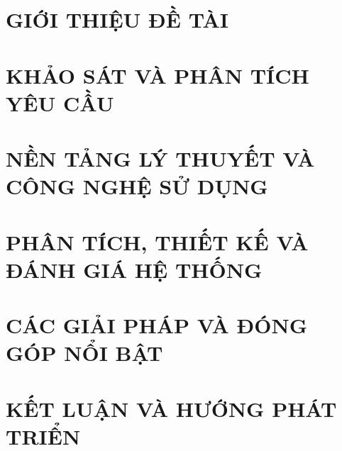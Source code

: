 \documentclass[a4paper,13pt,3p,oneside]{report}
\theoremstyle{definition}
\begin{document}
\renewcommand{\listtablename}{DANH MỤC BẢNG BIỂU}
{\let\oldnumberline\numberline
\renewcommand{\numberline}{Bảng~\oldnumberline}
\listoftables}

\newpage
\begingroup
\renewcommand{\thetable}{\arabic{table}}

\endgroup



\newpage
{}

\pagestyle{fancy}
\fancyhf{}
\fancyhead[L]{\leftmark}
\fancyfoot[R]{\thepage}

\chapter{GIỚI THIỆU ĐỀ TÀI}
\label{chapter:Introduction}

\newpage
\chapter{KHẢO SÁT VÀ PHÂN TÍCH YÊU CẦU}
\label{chapter:Related_works}



\newpage
\chapter{NỀN TẢNG LÝ THUYẾT VÀ CÔNG NGHỆ SỬ DỤNG}
\label{chapter:Methodology}


\newpage
\chapter[Phân tích, thiết kế và đánh giá]{PHÂN TÍCH, THIẾT KẾ VÀ ĐÁNH GIÁ HỆ THỐNG}
\label{chapter:Experiment}


\newpage
\chapter{CÁC GIẢI PHÁP VÀ ĐÓNG GÓP NỔI BẬT}
\label{chapter:SolutionAndContribution}

\newpage
\chapter{KẾT LUẬN VÀ HƯỚNG PHÁT TRIỂN} %
\label{chapter:conclusion}

\end{document}
